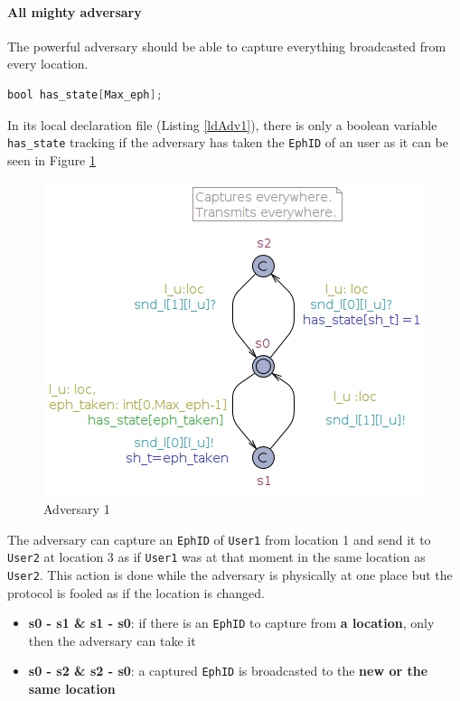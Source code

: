 \documentclass[a4paper, twocolumn]{article}
\begin{document}
\paragraph{All mighty adversary}
The powerful adversary should be able to capture everything broadcasted from every location. 
\begin{lstlisting}[language=C, caption= Adv1 Declarations,label={ldAdv1},xleftmargin=.02\textwidth]
bool has_state[Max_eph];
\end{lstlisting}
In its local declaration file (Listing \ref{ldAdv1}), there is only a boolean variable \texttt{has\_state} tracking if the adversary has taken the \texttt{EphID} of an user as it can be seen in Figure \ref{fig:adv1}
\begin{figure}[H]
    \centering
    \includegraphics[scale=0.4]{images/adv1.png}
    \caption{Adversary 1}
    \label{fig:adv1} 
\end{figure}
\noindent The adversary can capture an \texttt{EphID} of \texttt{User1} from location 1 and send it to \texttt{User2} at location 3 as if \texttt{User1} was at that moment in the same location as \texttt{User2}. This action is done while the adversary is physically at one place but the protocol is fooled as if the location is changed.
\begin{itemize}
    \item \textbf{s0 - s1 \& s1 - s0}: if there is an \texttt{EphID} to capture from \textbf{a location}, only then the adversary can take it
    \item \textbf{s0 - s2 \& s2 - s0}: a captured \texttt{EphID} is broadcasted to the \textbf{new or the same location} 
\end{itemize}
\end{document}
